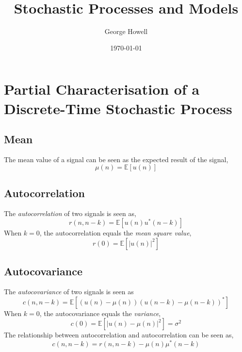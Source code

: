 \documentclass{article}
\title{Stochastic Processes and Models}
\author{George Howell}
\date{\today}
\begin{document}
    \maketitle
    \newpage

    \tableofcontents
    \newpage

    \section{Partial Characterisation of a Discrete-Time Stochastic Process}
    
    \subsection{Mean}
    The mean value of a signal can be seen as the expected result of the signal,
    \begin{equation}
        \mu(n) = \mathbb{E}[u(n)]
    \end{equation}

    \subsection{Autocorrelation}

    The \textit{autocorrelation} of two signals is seen as,
    \begin{equation}
        r(n, n-k) = \mathbb{E}[u(n)u^*(n-k)]
    \end{equation}
    When \(k=0\), the autocorrelation equals the \textit{mean square value},
    \begin{equation}
        r(0) = \mathbb{E}[|u(n)|^2]
    \end{equation}

    \subsection{Autocovariance}

    The \textit{autocovariance} of two signals is seen as
    \begin{equation}
        c(n, n-k) = \mathbb{E}[(u(n)-\mu(n))(u(n-k) - \mu(n-k))^*]
    \end{equation}
    When \(k=0\), the autocovariance equals the \textit{variance},
    \begin{equation}
        c(0) = \mathbb{E}[|u(n)-\mu(n)|^2] = \sigma^2
    \end{equation}
    The relationship between autocorrelation and autocorrelation can be seen as,
    \begin{equation}
        c(n, n-k) = r(n, n-k) - \mu(n)\mu^*(n-k)
    \end{equation}
\end{document}
